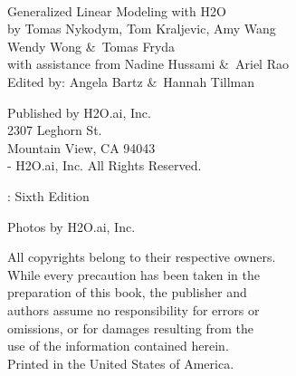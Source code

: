 
\newpage
\restoregeometry

\null\vfill %

\thispagestyle{empty}%


{\raggedright\vfill\ 

Generalized Linear Modeling with H2O\\

by Tomas Nykodym, Tom Kraljevic, Amy Wang \\ 
Wendy Wong \&\ Tomas Fryda \\
with assistance from Nadine Hussami \&\ Ariel Rao \\
Edited by: Angela Bartz \&\ Hannah Tillman

\bigskip
  Published by H2O.ai, Inc. \\
2307 Leghorn St. \\
Mountain View, CA 94043\\
\bigskip
{}-\the\year \hspace{1pt} H2O.ai, Inc. All Rights Reserved. 
\bigskip

\monthname \hspace{1pt}  \the\year: Sixth Edition
\bigskip

Photos by \textcopyright H2O.ai, Inc.
\bigskip

All copyrights belong to their respective owners.\\
While every precaution has been taken in the\\
preparation of this book, the publisher and\\
authors assume no responsibility for errors or\\
omissions, or for damages resulting from the\\
use of the information contained herein.\\
\bigskip
Printed in the United States of America. 
}

\newpage
\thispagestyle{empty}%
\tableofcontents
\thispagestyle{empty}%



